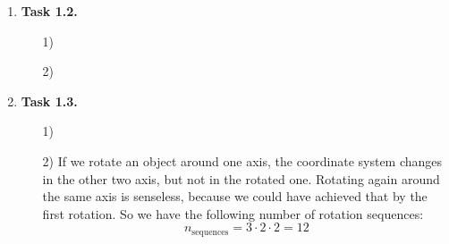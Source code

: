 \documentclass[a4paper,11pt]{article}
\begin{document}
\begin {enumerate}
\begin{enumerate}
        
        \item[2)] In this case we use Gimbal-angles, we need to right multiply the given transformation matrices. We get the following transformation matrix:
		$$M' \approx \begin{bmatrix}
			0.43559574039916 & -0.43559574039916 & 0.43301270189222 & 0\\
-0.61237243569579 & 0.61237243569579 & -0.5 & 0\\
0.047367172745376 & -0.047367172745376 & 0.75 & 0\\
0 & 0 & 0 & 1
		\end{bmatrix}$$
		After multiplying it with the given points, we get
		\begin{align*}
			A'' &\approx (4.3559574039916, -6.1237243569579, 0.47367172745376),\\
			B'' &\approx (4.4408920985006 \cdot 10^{-16}, 4.4408920985006  \cdot 10^{-16}, 5.5511151231258 \cdot 10^{-16}),\\
			C'' &\approx (-4.3559574039916, 6.1237243569579, -0.47367172745376),\\
			D'' &\approx (-4.4408920985006 \cdot 10^{-16}, -4.4408920985006 \cdot 10^{-16}, -5.5511151231258 \cdot 10^{-16}),\\
			E'' &\approx (12.990381056767, -15, 22.5)
		\end{align*}
    \end{enumerate}

\item[\textbf{Task 1.2.}]

    \begin{enumerate}
        \item[1)]
        \item[2)]
    \end{enumerate}

\item[\textbf{Task 1.3.}]

    \begin{enumerate}
        \item[1)]
        \item[2)] If we rotate an object around one axis, the coordinate system changes in the other two axis, but not in the rotated one. Rotating again around the same axis is senseless, because we could have achieved that by the first rotation. So we have the following number of rotation sequences:
        $$n_{\text{sequences}} = 3 \cdot 2 \cdot 2 = 12$$
    \end{enumerate}

\end {enumerate}
\end{document}

